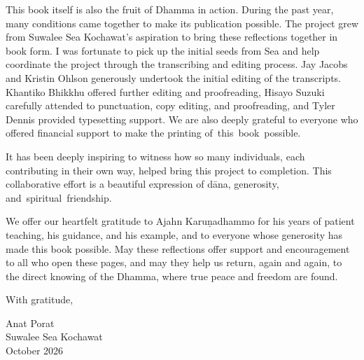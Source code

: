 This book itself is also the fruit of Dhamma in action. During the past year, many conditions came together to make its publication possible. The project grew from Suwalee Sea Kochawat's aspiration to bring these reflections together in book form. I was fortunate to pick up the initial seeds from Sea and help coordinate the project through the transcribing and editing process. Jay Jacobs and Kristin Ohlson generously undertook the initial editing of the transcripts. Khantiko Bhikkhu offered further editing and proofreading, Hisayo Suzuki carefully attended to punctuation, copy editing, and proofreading, and Tyler Dennis provided typesetting support. We are also deeply grateful to everyone who offered financial support to make the printing \mbox{of this book possible.}

It has been deeply inspiring to witness how so many individuals, each contributing in their own way, helped bring this project to completion. This collaborative effort is a beautiful expression of dāna, generosity, \mbox{and spiritual friendship.}

We offer our heartfelt gratitude to Ajahn Karuṇadhammo for his years of patient teaching, his guidance, and his example, and to everyone whose generosity has made this book possible. May these reflections offer support and encouragement to all who open these pages, and may they help us return, again and again, to the direct knowing of the Dhamma, where true peace and freedom are found.

With gratitude,

\bigskip

{\raggedleft
  Anat Porat\\
  Suwalee Sea Kochawat\\
  October 2026
\par}
